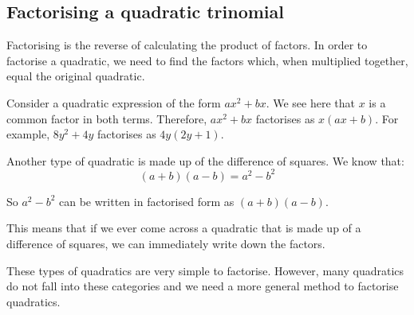 \subsection* {Factorising a quadratic trinomial }

Factorising is the reverse of calculating the product of factors. In order to factorise a quadratic, we need to find the factors which, when multiplied together, equal the original quadratic.\par 

Consider a quadratic expression of the form $a{x}^{2}+bx$. We see here
that $x$ is a common factor in both terms. Therefore, $a{x}^{2}+bx$
factorises as $x(ax+b)$. For example, $8{y}^{2}+4y$ factorises as
$4y(2y+1)$.

Another type of quadratic is made up of the difference of squares. We
know that:
\begin{equation*}
  (a+b)(a-b)={a}^{2}-{b}^{2}
\end{equation*}

So $a^2-b^2$ can be written in factorised form as $(a+b)(a-b)$.

\par
{}

This means that if we ever come across a quadratic that is made up of a difference of squares, we can immediately write down the factors. 


These types of quadratics are very simple to factorise. However, many quadratics do not fall into these categories and we need a more general method to factorise quadratics.

